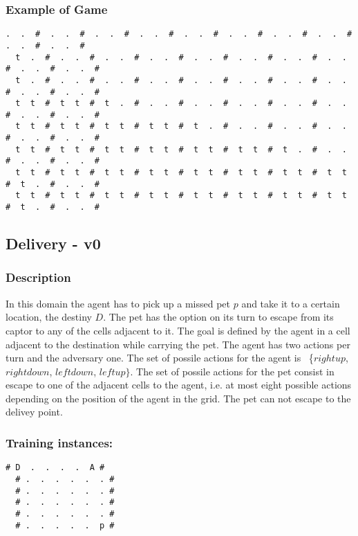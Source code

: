 \documentclass[a4paper]{article}
\begin{document}
\subsubsection{Example of Game}
\begin{Verbatim}[fontsize=\footnotesize]
  .  .  #  .  .  #  .  .  #  .  .  #  .  .  #  .  .  #  .  .  #  .  .  #  .  .  #  .  .  #
  t  .  #  .  .  #  .  .  #  .  .  #  .  .  #  .  .  #  .  .  #  .  .  #  .  .  #  .  .  #
  t  .  #  .  .  #  .  .  #  .  .  #  .  .  #  .  .  #  .  .  #  .  .  #  .  .  #  .  .  #
  t  t  #  t  t  #  t  .  #  .  .  #  .  .  #  .  .  #  .  .  #  .  .  #  .  .  #  .  .  #
  t  t  #  t  t  #  t  t  #  t  t  #  t  .  #  .  .  #  .  .  #  .  .  #  .  .  #  .  .  #
  t  t  #  t  t  #  t  t  #  t  t  #  t  t  #  t  t  #  t  .  #  .  .  #  .  .  #  .  .  #
  t  t  #  t  t  #  t  t  #  t  t  #  t  t  #  t  t  #  t  t  #  t  t  #  t  .  #  .  .  #
  t  t  #  t  t  #  t  t  #  t  t  #  t  t  #  t  t  #  t  t  #  t  t  #  t  .  #  .  .  #
\end{Verbatim}


\subsection{Delivery - v0}
\subsubsection{Description}

In this domain the agent has to pick up a missed pet $p$ and take it to a certain location, the destiny $D$. The pet has the option on its turn to escape from its captor to any of the cells adjacent to it. The goal is defined by the agent in a cell adjacent to the destination while carrying the pet. The agent has two actions per turn and the adversary one. The set of possile actions for the agent is ~\{$rightup$, $rightdown$, $leftdown$, $leftup\}$.  The set of possile actions for the pet consist in escape to one of the adjacent cells to the agent, i.e. at most eight possible actions depending on the position of the agent in the grid. The pet can not escape to the delivey point.

\subsubsection{Training instances:}
\begin{Verbatim}[fontsize=\footnotesize]
  # D  .  .  .  .  A #
  # .  .  .  .  .  . #
  # .  .  .  .  .  . #
  # .  .  .  .  .  . #
  # .  .  .  .  .  . #
  # .  .  .  .  .  p #
\end{Verbatim}
\end{document}
